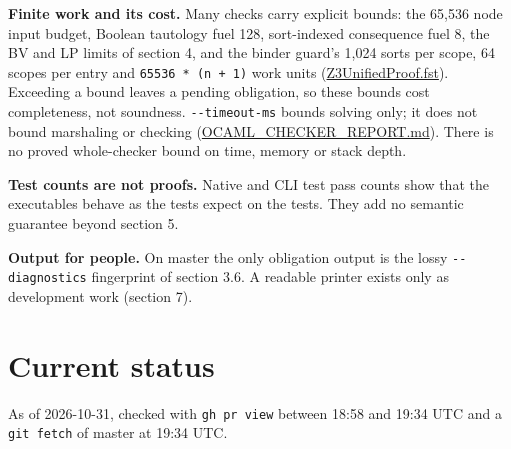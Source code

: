 \documentclass[10pt,a4paper]{article}
\begin{document}
\textbf{Finite work and its cost.} Many checks carry explicit bounds: the 65,536 node input budget, Boolean tautology fuel 128, sort-indexed consequence fuel 8, the BV and LP limits of section 4, and the binder guard's 1,024 sorts per scope, 64 scopes per entry and \texttt{65536 * (\allowbreak{}n + 1)} work units (\href{https://github.com/Z3Prover/z3/blob/8fbb275aba0472e862e289c7af1331b3bd5d512c/fstar/Z3UnifiedProof.fst\#L611-L619}{Z3Unified\allowbreak{}Proof.\allowbreak{}fst}). Exceeding a bound leaves a pending obligation, so these bounds cost completeness, not soundness. \texttt{-{}\allowbreak{}-{}\allowbreak{}timeout-{}\allowbreak{}ms} bounds solving only; it does not bound marshaling or checking (\href{https://github.com/Z3Prover/z3/blob/8fbb275aba0472e862e289c7af1331b3bd5d512c/fstar/OCAML_CHECKER_REPORT.md\#L2453-L2454}{OCAML\_\allowbreak{}CHECKER\_\allowbreak{}REPORT.\allowbreak{}md}). There is no proved whole-checker bound on time, memory or stack depth.

\textbf{Test counts are not proofs.} Native and CLI test pass counts show that the executables behave as the tests expect on the tests. They add no semantic guarantee beyond section 5.

\textbf{Output for people.} On master the only obligation output is the lossy \texttt{-{}\allowbreak{}-{}\allowbreak{}diagnostics} fingerprint of section 3.6. A readable printer exists only as development work (section 7).

\section{Current status}\label{sec:7-current-status}

As of 2026-10-31, checked with \texttt{gh pr view} between 18:58 and 19:34 UTC and a \texttt{git fetch} of master at 19:34 UTC.
\end{document}

